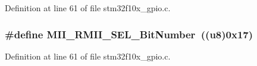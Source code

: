 Definition at line 61 of file stm32f10x\+\_\+gpio.\+c.

\subsubsection[{\texorpdfstring{M\+I\+I\+\_\+\+R\+M\+I\+I\+\_\+\+S\+E\+L\+\_\+\+Bit\+Number}{MII_RMII_SEL_BitNumber}}]{\setlength{\rightskip}{0pt plus 5cm}\#define M\+I\+I\+\_\+\+R\+M\+I\+I\+\_\+\+S\+E\+L\+\_\+\+Bit\+Number~(({\bf u8})0x17)}\hypertarget{group___g_p_i_o___private___defines_gad4a9bbd669109039291f942d923ff8ae}{}\label{group___g_p_i_o___private___defines_gad4a9bbd669109039291f942d923ff8ae}


Definition at line 61 of file stm32f10x\+\_\+gpio.\+c.

